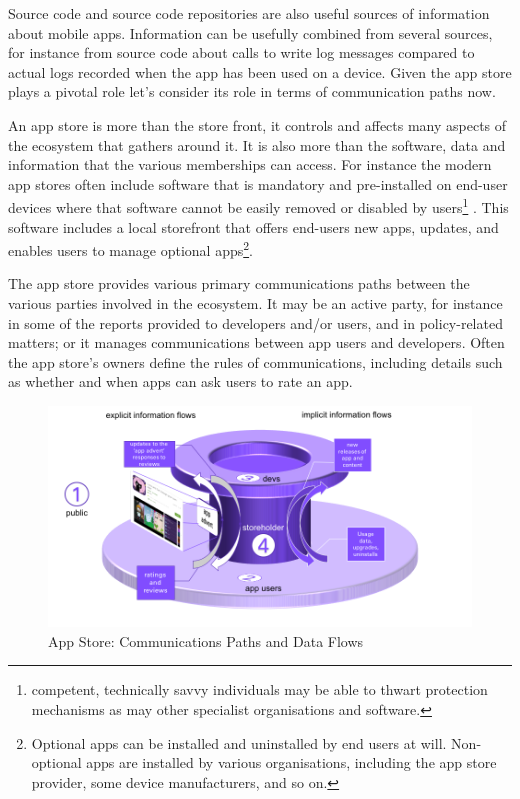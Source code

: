 Source code and source code repositories are also useful sources of information about mobile apps. Information can be usefully combined from several sources, for instance from source code about calls to write log messages compared to actual logs recorded when the app has been used on a device. Given the app store plays a pivotal role let's consider its role in terms of communication paths now. 

An app store is more than the store front, it controls and affects many aspects of the ecosystem that gathers around it. It is also more than the software, data and information that the various memberships can access. For instance the modern app stores often include software that is mandatory and pre-installed on end-user devices where that software cannot be easily removed or disabled by users\footnote{competent, technically savvy individuals may be able to thwart protection mechanisms as may other specialist organisations and software.} . This software includes a local storefront that offers end-users new apps, updates, and enables users to manage optional apps\footnote{Optional apps can be installed and uninstalled by end users at will. Non-optional apps are installed by various organisations, including the app store provider, some device manufacturers, and so on.}.

The app store provides various primary communications paths between the various parties involved in the ecosystem. It may be an active party, for instance in some of the reports provided to developers and/or users, and in policy-related matters; or it manages communications between app users and developers. Often the app store's owners define the rules of communications, including details such as whether and when apps can ask users to rate an app.

\begin{figure}[htbp!]
    \centering
    \includegraphics[width=17cm]{images/app-store-data-flows-3d.png}
    \caption{App Store: Communications Paths and Data Flows}
    \label{fig:app-store-data-flows}
\end{figure}


